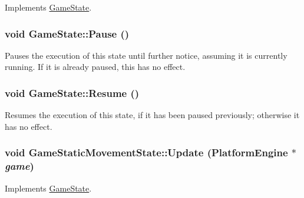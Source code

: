 Implements \hyperlink{class_game_state_488fd39ceb2907b13e11f03607f16e5f}{GameState}.\hypertarget{class_game_state_0c47c6969a4e0bb32d6cdf7bf9376817}{
\subsubsection[{Pause}]{\setlength{\rightskip}{0pt plus 5cm}void GameState::Pause ()}}
\label{dd/d87/class_game_state_0c47c6969a4e0bb32d6cdf7bf9376817}


Pauses the execution of this state until further notice, assuming it is currently running. If it is already paused, this has no effect. \hypertarget{class_game_state_d12ece3c3fb066281b73b07a315f04e8}{
\subsubsection[{Resume}]{\setlength{\rightskip}{0pt plus 5cm}void GameState::Resume ()}}
\label{dd/d87/class_game_state_d12ece3c3fb066281b73b07a315f04e8}


Resumes the execution of this state, if it has been paused previously; otherwise it has no effect. \hypertarget{class_game_static_movement_state_5a3bd910a85487be371c088a1be16996}{
\subsubsection[{Update}]{\setlength{\rightskip}{0pt plus 5cm}void GameStaticMovementState::Update ({\bf PlatformEngine} $\ast$ {\em game})}}
\label{d7/d3b/class_game_static_movement_state_5a3bd910a85487be371c088a1be16996}




Implements \hyperlink{class_game_state_100ca49bc95afce1d5c5b756708bbc2b}{GameState}.


